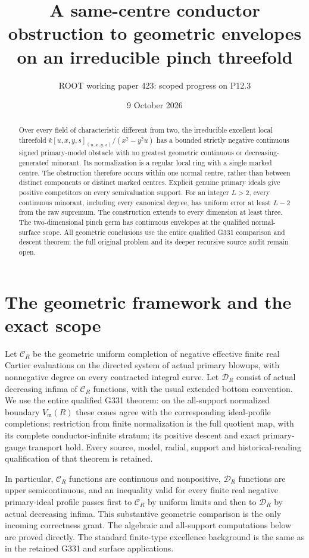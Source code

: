 \documentclass[11pt]{article}
\title{A same-centre conductor obstruction to geometric envelopes\\
on an irreducible pinch threefold}
\author{ROOT working paper 423: scoped progress on P12.3}
\date{9 October 2026}
\newcommand{\m}{\mathfrak m}
\newcommand{\Cc}{\mathcal C}
\newcommand{\Dd}{\mathcal D}
\begin{document}
\maketitle

\begin{abstract}
Over every field of characteristic different from two, the irreducible
excellent local threefold
$k[u,x,y,s]_{(u,x,y,s)}/(x^2-y^2u)$ has a bounded strictly negative
continuous signed primary-model obstacle with no greatest geometric
continuous or decreasing-generated minorant. Its normalization is a
regular local ring with a single marked centre. The obstruction therefore
occurs within one normal centre, rather than between distinct components
or distinct marked centres. Explicit genuine primary ideals give positive
competitors on every semivaluation support. For an integer $L>2$, every
continuous minorant, including every canonical degree, has uniform error
at least $L-2$ from the raw supremum. The construction extends to every
dimension at least three. The two-dimensional pinch germ has continuous
envelopes at the qualified normal-surface scope. All geometric conclusions
use the entire qualified G331 comparison and descent theorem; the full
original problem and its deeper recursive source audit remain open.
\end{abstract}

\section{The geometric framework and the exact scope}
Let $\Cc_R$ be the geometric uniform completion of negative effective
finite real Cartier evaluations on the directed system of actual primary
blowups, with nonnegative degree on every contracted integral curve.
Let $\Dd_R$ consist of actual decreasing infima of $\Cc_R$ functions,
with the usual extended bottom convention. We use the entire qualified
G331 theorem: on the all-support normalized boundary $V_{\m}(R)$ these
cones agree with the corresponding ideal-profile completions; restriction
from finite normalization is the full quotient map, with its complete
conductor-infinite stratum; its positive descent and exact primary-gauge
transport hold. Every source, model, radial, support and historical-reading
qualification of that theorem is retained.

In particular, $\Cc_R$ functions are continuous and nonpositive,
$\Dd_R$ functions are upper semicontinuous, and an inequality valid for
every finite real negative primary-ideal profile passes first to
$\Cc_R$ by uniform limits and then to $\Dd_R$ by actual decreasing
infima. This substantive geometric comparison is the only incoming
correctness grant. The algebraic and all-support computations below are
proved directly. The standard finite-type excellence background is the
same as in the retained G331 and surface applications.
\end{document}
